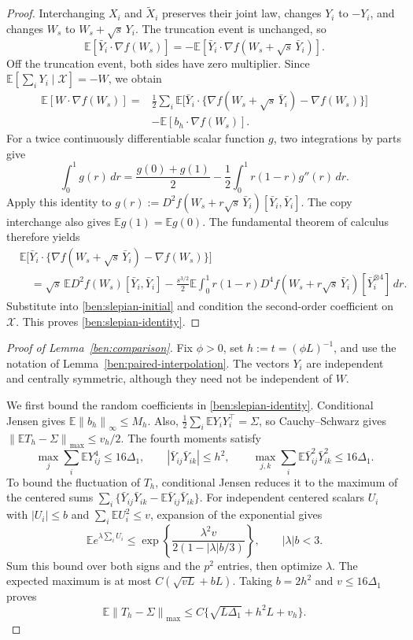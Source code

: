 \documentclass[11pt,letterpaper]{article}
\newenvironment{recovered}{}{}
\theoremstyle{remark}
\newcommand{\E}{\mathbb E}
\newcommand{\norm}[1]{\left\lVert#1\right\rVert}
\begin{document}
\begin{recovered}
\begin{proof}
Interchanging \(X_i\) and \(\widetilde X_i\) preserves their joint
law, changes \(Y_i\) to \(-Y_i\), and changes \(W_s\) to
\(W_s+\sqrt s\,Y_i\). The truncation event is unchanged, so
\[
 \E[\bar Y_i\cdot\nabla f(W_s)]
 =-\E[\bar Y_i\cdot\nabla f(W_s+\sqrt s\,\bar Y_i)].
\]
Off the truncation event, both sides have zero multiplier. Since
\(\E[\sum_iY_i\mid\mathcal X]=-W\), we obtain
\begin{align*}
 \E[W\cdot\nabla f(W_s)]
 ={}&\frac12\sum_i\E\big[\bar Y_i\cdot
       \{\nabla f(W_s+\sqrt s\,\bar Y_i)-\nabla f(W_s)\}\big]\\
 &-\E[b_h\cdot\nabla f(W_s)].
\end{align*}
For a twice continuously differentiable scalar function \(g\),
two integrations by parts give
\[
 \int_0^1g(r)\,dr
 =\frac{g(0)+g(1)}2-\frac12\int_0^1r(1-r)g''(r)\,dr.
\]
Apply this identity to
\(g(r):=D^2f(W_s+r\sqrt s\,\bar Y_i)[\bar Y_i,\bar Y_i]\).
The copy interchange also gives \(\E g(1)=\E g(0)\).
The fundamental theorem of calculus therefore yields
\begin{align*}
 &\E\big[\bar Y_i\cdot
   \{\nabla f(W_s+\sqrt s\,\bar Y_i)-\nabla f(W_s)\}\big]\\
 &\quad=\sqrt s\,\E D^2f(W_s)[\bar Y_i,\bar Y_i]
 -\frac{s^{3/2}}2\E\int_0^1r(1-r)
       D^4f(W_s+r\sqrt s\,\bar Y_i)[\bar Y_i^{\otimes4}]\,dr.
\end{align*}
Substitute into \eqref{ben:slepian-initial} and condition the
second-order coefficient on \(\mathcal X\). This proves
\eqref{ben:slepian-identity}.
\end{proof}

\begin{proof}[Proof of Lemma~\ref{ben:comparison}]
Fix \(\phi>0\), set \(h:=t=(\phi L)^{-1}\), and use the
notation of Lemma~\ref{ben:paired-interpolation}. The vectors
\(Y_i\) are independent and centrally symmetric, although they
need not be independent of \(W\).

We first bound the random coefficients in
\eqref{ben:slepian-identity}. Conditional Jensen gives
\(\E\norm{b_h}_\infty\le M_h\). Also,
\(\frac12\sum_i\E Y_iY_i^\top=\Sigma\), so Cauchy--Schwarz
gives \(\norm{\E T_h-\Sigma}_{\max}\le v_h/2\).
The fourth moments satisfy
\[
 \max_j\sum_i\E Y_{ij}^4\le16\Delta_1,\qquad
 |\bar Y_{ij}\bar Y_{ik}|\le h^2,\qquad
 \max_{j,k}\sum_i\E\bar Y_{ij}^2\bar Y_{ik}^2\le16\Delta_1.
\]
To bound the fluctuation of \(T_h\), conditional Jensen reduces it
to the maximum of the centered sums
\(\sum_i\{\bar Y_{ij}\bar Y_{ik}-\E\bar Y_{ij}\bar Y_{ik}\}\).
For independent centered scalars \(U_i\) with \(|U_i|\le b\)
and \(\sum_i\E U_i^2\le v\), expansion of the exponential gives
\[
 \E e^{\lambda\sum_iU_i}
 \le\exp\!\left\{\frac{\lambda^2v}{2(1-|\lambda|b/3)}\right\},
 \qquad |\lambda|b<3.
\]
Sum this bound over both signs and the \(p^2\) entries, then
optimize \(\lambda\). The expected maximum is at most
\(C(\sqrt{vL}+bL)\). Taking \(b=2h^2\) and
\(v\le16\Delta_1\) proves
\begin{equation}\label{ben:conditional-matrix}
 \E\norm{T_h-\Sigma}_{\max}
 \le C\{\sqrt{L\Delta_1}+h^2L+v_h\}.
\end{equation}


\end{proof}
\end{recovered}
\end{document}
